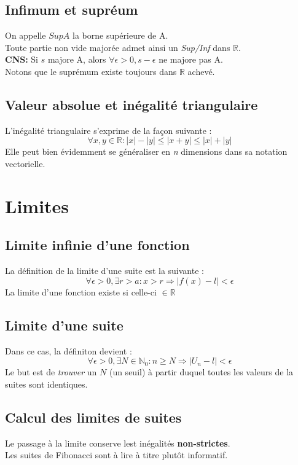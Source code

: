 \documentclass[11pt, a4paper, openany]{book}
\begin{document}
\section{Infimum et supréum}
On appelle $SupA$ la borne supérieure de A.\\
Toute partie non vide  majorée admet ainsi un \textit{Sup/Inf} dans $\mathbb{R}$.\\
\textbf{CNS:} Si $s$ majore A, alors $\forall \epsilon > 0, s- \epsilon $ ne majore pas A.\\
Notons que le suprémum existe toujours dans $\mathbb{R}$ achevé.

\section{Valeur absolue et inégalité triangulaire}
L'inégalité triangulaire s'exprime de la façon suivante :
$$ \forall x, y \in \mathbb{R} : |x| - |y| \leq |x + y| \leq |x| + |y| $$
Elle peut bien évidemment se généraliser en \textit{n} dimensions dans sa notation vectorielle.

\chapter{Limites}
\section{Limite infinie d'une fonction}
La définition de la limite d'une suite est la suivante :
$$ \forall \epsilon > 0, \exists r > a : x > r \Rightarrow |f(x) - l| < \epsilon $$
La limite d'une fonction existe si celle-ci $\in \mathbb{R}$

\section{Limite d'une suite}
Dans ce cas, la définiton devient :
$$ \forall \epsilon > 0, \exists N \in \mathbb{N}_{0} : n \geq N \Rightarrow |U_{n} - l| < \epsilon$$
Le but est de \textit{trouver} un $N$ (un seuil) à partir duquel toutes les valeurs de la suites sont identiques.\\


\section*{Calcul des limites de suites}
Le passage à la limite conserve lest inégalités \textbf{non-strictes}.\\
Les suites de Fibonacci sont à lire à titre plutôt informatif.
\end{document}
